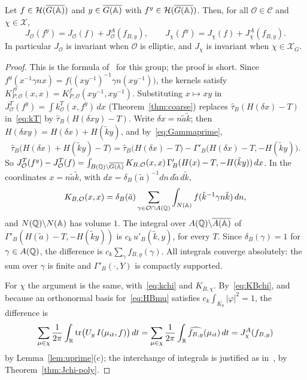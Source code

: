 \begin{lemma}\label{lem:variance-global}
Let $f\in\mathcal H(\overline{G(\mathbb{A})})$ and $y\in\overline{G(\mathbb{A})}$ with $f^y\in\mathcal H(\overline{G(\mathbb{A})})$. Then,
for all $\mathcal O\in\mathcal C$ and $\chi\in\mathcal X$,
\[
J_{\mathcal O}(f^y)=J_{\mathcal O}(f)+J^A_{\mathcal O}(f_{B,y}),\qquad
J_\chi(f^y)=J_\chi(f)+J^A_\chi(f_{B,y}).
\]
In particular $J_{\mathcal O}$ is invariant when $\mathcal O$ is elliptic,
and $J_\chi$ is invariant when $\chi\in\mathcal X_G$.
\end{lemma}

\begin{proof}
This is the formula of~\cite[\S3]{Ar81} for this group; the proof is
short. Since
$f^y(x^{-1}\gamma nx)=f\bigl((xy^{-1})^{-1}\gamma n(xy^{-1})\bigr)$, the
kernels satisfy $K_{P,\mathcal O}^{f^y}(x,x)=K_{P,\mathcal O}^f(xy^{-1},
xy^{-1})$. Substituting $x\mapsto xy$ in $J^T_{\mathcal O}(f^y)=\int
k^T_{\mathcal O}(x,f^y)\,dx$ (Theorem~\ref{thm:coarse}) replaces
$\hat\tau_B(H(\delta x)-T)$ in~\eqref{eq:kT} by $\hat\tau_B(H(\delta
xy)-T)$. Write $\delta x=n\tilde a\tilde k$; then $H(\delta xy)=H(\delta
x)+H(\tilde ky)$, and by~\eqref{eq:Gammaprime},
\[
\hat\tau_B\bigl(H(\delta x)+H(\tilde ky)-T\bigr)=\hat\tau_B\bigl(H(\delta
x)-T\bigr)-\Gamma'_B\bigl(H(\delta x)-T,-H(\tilde ky)\bigr).
\]
So $J^T_{\mathcal O}(f^y)-J^T_{\mathcal O}(f)=\int_{B(\mathbb{Q})\backslash\overline{G(\mathbb{A})}}
K_{B,\mathcal O}(x,x)\,\Gamma'_B(H(x)-T,-H(\tilde ky))\,dx$. In the
coordinates $x=n\tilde a\tilde k$, with $dx=\delta_B(\tilde a)^{-1}dn\,
d\tilde a\,d\tilde k$,
\[
K_{B,\mathcal O}(x,x)=\delta_B(\tilde a)\sum_{\gamma\in\mathcal O\cap A(\mathbb{Q})}
\int_{N(\mathbb{A})}f(\tilde k^{-1}\gamma n\tilde k)\,dn,
\]
and $N(\mathbb{Q})\backslash N(\mathbb{A})$ has volume $1$. The integral over
$A(\mathbb{Q})\backslash\overline{A(\mathbb{A})}$ of $\Gamma'_B(H(\tilde a)-T,-H(\tilde
ky))$ is $c_k\,u'_B(\tilde k,y)$, for every $T$. Since $\delta_B(\gamma)=1$
for $\gamma\in A(\mathbb{Q})$, the difference is $c_k\sum_\gamma f_{B,y}(\gamma)$.
All integrals converge absolutely: the sum over $\gamma$ is finite and
$\Gamma'_B(\cdot,Y)$ is compactly supported.

For $\chi$ the argument is the same, with~\eqref{eq:kchi} and
$K_{B,\chi}$. By~\eqref{eq:KBchi}, and because an orthonormal basis
for~\eqref{eq:HBmu} satisfies $c_k\int_{\overline{K_0}}|\varphi|^2=1$, the
difference is
\[
\sum_{\mu\in\chi}\frac1{2\pi}\int_{\mathbb{R}}\operatorname{tr}\bigl(U_y\,
I(\mu_{it},f)\bigr)\,dt=\sum_{\mu\in\chi}\frac1{2\pi}\int_{\mathbb{R}}
\widehat{f_{B,y}}(\mu_{it})\,dt=J^A_\chi(f_{B,y})
\]
by Lemma~\ref{lem:uprime}(c); the interchange of integrals is justified
as in~\cite[\S3]{Ar81}, by Theorem~\ref{thm:Jchi-poly}.
\end{proof}

